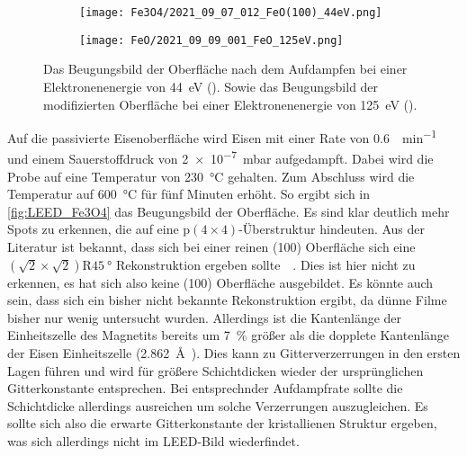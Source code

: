         \begin{figure}
            \begin{subfigure}[t]{0.48\textwidth}
                \centering
                \texttt{[image: Fe3O4/2021\_09\_07\_012\_FeO(100)\_44eV.png]}
                \subcaption{}
                \label{fig:LEED_Fe3O4}
            \end{subfigure}
            \begin{subfigure}[t]{0.48\textwidth}
                \centering
                \texttt{[image: FeO/2021\_09\_09\_001\_FeO\_125eV.png]}
                \subcaption{}
                \label{fig:LEED_FeO}
            \end{subfigure}
            \caption{Das Beugungsbild der Oberfläche nach dem Aufdampfen bei einer Elektronenenergie von \SI{44}{\electronvolt} ().
            Sowie das Beugungsbild der modifizierten Oberfläche bei einer Elektronenenergie von \SI{125}{\electronvolt} ().}
        \end{figure}
        Auf die passivierte Eisenoberfläche wird Eisen mit einer Rate von \SI{0.6}{\ML\per\minute} und einem Sauerstoffdruck von \SI{2e-7}{\milli\bar} aufgedampft.
        Dabei wird die Probe auf eine Temperatur von \SI{230}{\celsius} gehalten.
        Zum Abschluss wird die Temperatur auf \SI{600}{\celsius} für fünf Minuten erhöht.
        So ergibt sich in \autoref{fig:LEED_Fe3O4} das Beugungsbild der Oberfläche.
        Es sind klar deutlich mehr Spots zu erkennen, die auf eine $\text{p}(4 \times 4)$-Überstruktur hindeuten.
        Aus der Literatur ist bekannt, dass sich bei einer reinen (100) Oberfläche sich eine $(\sqrt{2}\times\sqrt{2})\text{R}\SI{45}{\degree}$ Rekonstruktion ergeben sollte~~\cite{ruwisch_vsm-untersuchung_2016}.
        Dies ist hier nicht zu erkennen, es hat sich also keine (100) Oberfläche ausgebildet.
        Es könnte auch sein, dass sich ein bisher nicht bekannte Rekonstruktion ergibt, da dünne Filme bisher nur wenig untersucht wurden.
        Allerdings ist die Kantenlänge der Einheitszelle des Magnetits bereits um \SI{7}{\percent} größer als die dopplete Kantenlänge der Eisen Einheitszelle (\SI{2.862}{\angstrom}~\cite{springer_database}).
        Dies kann zu Gitterverzerrungen in den ersten Lagen führen und wird für größere Schichtdicken wieder der ursprünglichen Gitterkonstante entsprechen.
        Bei entsprechnder Aufdampfrate sollte die Schichtdicke allerdings ausreichen um solche Verzerrungen auszugleichen.
        Es sollte sich also die erwarte Gitterkonstante der kristallienen Struktur ergeben, was sich allerdings nicht im LEED-Bild wiederfindet.

